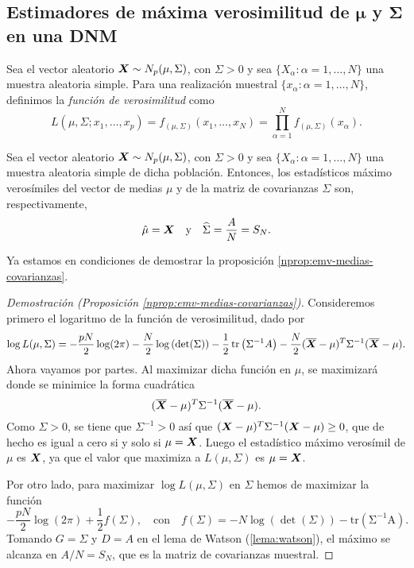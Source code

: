 \subsection{Estimadores de máxima verosimilitud de \texorpdfstring{$\boldsymbol \mu$}{mu} y \texorpdfstring{$\boldsymbol \Sigma$}{sigma} en una DNM}

\begin{ndef}
  Sea el vector aleatorio $\boldsymbol{X} \sim N_p(\mu,\Sigma)$, con $\Sigma > 0$ y sea $\{X_\alpha : \alpha =1,\dots,N \}$ una muestra aleatoria simple.
  Para una realización muestral $\{ x_\alpha : \alpha = 1, \dots, N\}$, definimos la \textit{función de verosimilitud} como
  \[
  L(\mu,\Sigma;x_1,\dots,x_p) = f_{(\mu,\Sigma)}(x_1,\dots,x_N) = \prod_{\alpha = 1}^N f_{(\mu,\Sigma)}(x_\alpha).
  \]

\end{ndef}

\begin{nprop}
  \label{nprop:emv-medias-covarianzas}
  Sea el vector aleatorio $\boldsymbol{X} \sim N_p(\mu,\Sigma)$, con $\Sigma> 0$ y sea $\{ X_\alpha : \alpha = 1,\dots, N\}$ una muestra aleatoria simple de dicha población. 
  Entonces, los estadísticos máximo verosímiles del vector de medias $\mu$ y de la matriz de covarianzas $\Sigma$ son, respectivamente,
  \[
  \hat{\mu} = \boldsymbol{X} \quad \text{y} \quad \widehat{\Sigma} = \frac{A}{N} = S_N.
  \]
\end{nprop}


Ya estamos en condiciones de demostrar la proposición \ref{nprop:emv-medias-covarianzas}.

\begin{proof}[Demostración (Proposición \ref{nprop:emv-medias-covarianzas})]
  Consideremos primero el logaritmo de la función de verosimilitud, dado por
  \[
    \log L(\mu,\Sigma) = -\frac{pN}{2}\log(2\pi) - \frac{N}{2}\log\left(\det(\Sigma)\right) - \frac{1}{2}\operatorname{tr}\left(\Sigma^{-1}A\right) - \frac{N}{2}(\overline{\boldsymbol{X}} - \mu)^T \Sigma^{-1}(\overline{\boldsymbol{X}} - \mu).
  \]
  Ahora vayamos por partes. Al maximizar dicha función en \(\mu\), se maximizará donde se minimice la forma cuadrática
  \[
    (\overline{\boldsymbol{X}} - \mu)^T \Sigma^{-1}(\overline{\boldsymbol{X}} - \mu).
  \]
  Como $\Sigma > 0$, se tiene que $\Sigma^{-1} > 0$ así que $(\boldsymbol{X} - \mu)^T \Sigma^{-1}(\boldsymbol{X} - \mu) \geq 0$, que de hecho es igual a cero si y solo si $\mu = \boldsymbol{X}$. 
  Luego el estadístico máximo verosímil de $\mu$ es $\boldsymbol{X}$, ya que el valor que maximiza a $L(\mu,\Sigma)$ es $\mu = \boldsymbol{X}$.

  Por otro lado, para maximizar $\log L(\mu,\Sigma)$ en $\Sigma$ hemos de maximizar la función
  \[
    -\frac{pN}{2}\log(2\pi) + \frac{1}{2}f(\Sigma), \quad \text{con} \quad f(\Sigma) = -N\log(\operatorname{det}(\Sigma)) - \operatorname{tr(\Sigma^{-1}A)}.
  \]
  Tomando \(G = \Sigma\) y \(D = A\) en el lema de Watson (\ref{lema:watson}), el máximo se alcanza en \(A/N = S_N\), que es la matriz de covarianzas muestral.
\end{proof}

